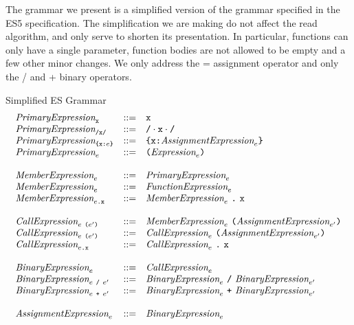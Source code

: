 \documentclass[preprint,10pt]{sigplanconf}
\begin{document}
The grammar we present is a simplified version of the grammar
specified in the ES5 specification. The simplification we are making
do not affect the read algorithm, and only serve to shorten its
presentation. In particular, functions can only have a single
parameter, function bodies are not allowed to be empty and a few other
minor changes. We only address the = assignment operator and only the
/ and + binary operators.

\begin{displayfigure*}{\label{fig:grammar}Simplified ES Grammar}
\[
\begin{array}{lcl}
  \textit{PrimaryExpression}_{\texttt{x}} &::=& \texttt{x} 
  \\
  \textit{PrimaryExpression}_{\texttt{/x/}} &::=& \texttt{/} \cdot \texttt{x} \cdot \texttt{/} 
  \\
  \textit{PrimaryExpression}_{\texttt{\{}\texttt{x} \texttt{:} e\texttt{\}}} &::=& 
  \texttt{\{}\texttt{x} \texttt{:} \textit{AssignmentExpression}_{e}\texttt{\}}
  \\
  \textit{PrimaryExpression}_{e} &::=& 
  \texttt{(}\textit{Expression}_{e}\texttt{)}
  \\ \\
  \textit{MemberExpression}_{e} &::=&
  \textit{PrimaryExpression}_{e}
  \\
  \textit{MemberExpression}_{e} &::=&
  \textit{FunctionExpression}_{e}
  \\
  \textit{MemberExpression}_{e\texttt{.\texttt{x}}} &::=&
  \textit{MemberExpression}_{e}~\texttt{.}~\texttt{x}
  \\ \\
  \textit{CallExpression}_{e~\texttt{(}e'\texttt{)}} &::=& 
  \textit{MemberExpression}_{e}~
  \texttt{(}\textit{AssignmentExpression}_{e'}\texttt{)}
  \\
  \textit{CallExpression}_{e~\texttt{(}e'\texttt{)}} &::=& 
  \textit{CallExpression}_{e}~
  \texttt{(}\textit{AssignmentExpression}_{e'}\texttt{)}
  \\
  \textit{CallExpression}_{e\texttt{.\texttt{x}}} &::=& 
  \textit{CallExpression}_{e}~\texttt{.}~
  \texttt{x}
  \\ \\
  \textit{BinaryExpression}_{e} &::=& \textit{CallExpression}_{e} \\
  \textit{BinaryExpression}_{e ~\texttt{/}~ e'}
  &::=&
  \textit{BinaryExpression}_{e} ~\texttt{/}~ \textit{BinaryExpression}_{e'} \\
  \textit{BinaryExpression}_{e ~\texttt{+}~ e'}
  &::=&
  \textit{BinaryExpression}_{e} ~\texttt{+}~ \textit{BinaryExpression}_{e'}
  \\ \\
  \textit{AssignmentExpression}_{e} &::=&
  \textit{BinaryExpression}_{e}

\end{array}\]
\end{displayfigure*}
\end{document}
